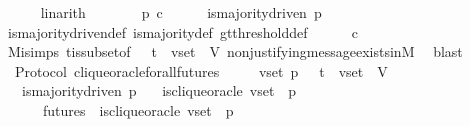 \begin{isabellebody}
\ \ \ \ \isamarkupfalse%
\ linarith\ \ \isanewline
\ \ \isamarkupfalse%
\ \isamarkupfalse%
\ {\isachardoublequoteopen}p\ c{\isachardoublequoteclose}\isanewline
\ \ \ \ \isamarkupfalse%
\ {\isacartoucheopen}is{\isacharunderscore}majority{\isacharunderscore}driven\ p{\isacartoucheclose}\ \isamarkupfalse%
\ is{\isacharunderscore}majority{\isacharunderscore}driven{\isacharunderscore}def\ is{\isacharunderscore}majority{\isacharunderscore}def\ gt{\isacharunderscore}threshold{\isacharunderscore}def\isanewline
\ \ \ \ \isamarkupfalse%
\ {\isacartoucheopen}c\ {\isasymin}\ {\isasymepsilon}\ {\isasymsigma}{\isacartoucheclose}\ \isanewline
\ \ \ \ \isamarkupfalse%
\ Mi{\isachardot}simps\ {\isasymSigma}t{\isacharunderscore}is{\isacharunderscore}subset{\isacharunderscore}of{\isacharunderscore}{\isasymSigma}\ {\isacartoucheopen}{\isasymsigma}\ {\isasymin}\ {\isasymSigma}t\ {\isasymand}\ v{\isacharunderscore}set\ {\isasymsubseteq}\ V{\isacartoucheclose}\ non{\isacharunderscore}justifying{\isacharunderscore}message{\isacharunderscore}exists{\isacharunderscore}in{\isacharunderscore}M{\isacharunderscore}{}\ \isamarkupfalse%
\ blast\ \ \ \ \isanewline
{}\isamarkupfalse%
%
\endisatagproof
{\isafoldproof}%
%
\isadelimproof
\isanewline
%
\endisadelimproof
\isanewline
\isanewline
{}\isamarkupfalse%
\ {\isacharparenleft}\ Protocol{\isacharparenright}\ clique{\isacharunderscore}oracle{\isacharunderscore}for{\isacharunderscore}all{\isacharunderscore}futures\ {\isacharcolon}\isanewline
\ \ {\isachardoublequoteopen}{\isasymforall}\ {\isasymsigma}\ v{\isacharunderscore}set\ p{\isachardot}\ {\isasymsigma}\ {\isasymin}\ {\isasymSigma}t\ {\isasymand}\ v{\isacharunderscore}set\ {\isasymsubseteq}\ V\ \isanewline
\ \ {\isasymlongrightarrow}\ is{\isacharunderscore}majority{\isacharunderscore}driven\ p\isanewline
\ \ {\isasymlongrightarrow}\ is{\isacharunderscore}clique{\isacharunderscore}oracle\ {\isacharparenleft}v{\isacharunderscore}set{\isacharcomma}\ {\isasymsigma}{\isacharcomma}\ p{\isacharparenright}\ \isanewline
\ \ {\isasymlongrightarrow}\ {\isacharparenleft}{\isasymforall}\ {\isasymsigma}{\isacharprime}\ {\isasymin}\ futures\ {\isasymsigma}{\isachardot}\ is{\isacharunderscore}clique{\isacharunderscore}oracle\ {\isacharparenleft}v{\isacharunderscore}set{\isacharcomma}\ {\isasymsigma}{\isacharprime}{\isacharcomma}\ p{\isacharparenright}{\isacharparenright}{\isachardoublequoteclose}\isanewline

\end{isabellebody}
